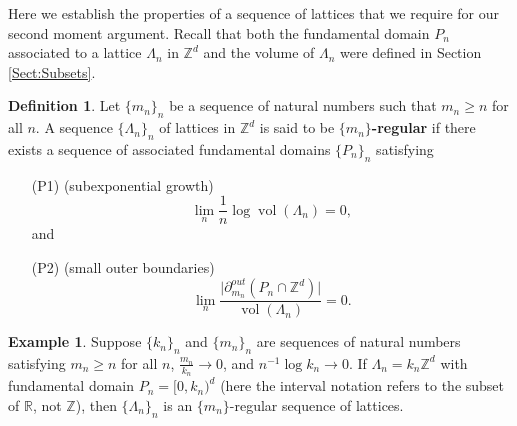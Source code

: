 \documentclass[12pt]{amsart}
\theoremstyle{definition}
\newtheorem{definition}[theorem]{Definition}
\newtheorem{example}[theorem]{Example}
\def\Z{\mathbb{Z}}
\DeclareMathOperator{\dist}{dist}
\DeclareMathOperator{\vol}{vol}
\begin{document}
Here we establish the properties of a sequence of lattices that we require for our second moment argument. %
Recall that both the fundamental domain $P_n$ associated to a lattice $\Lambda_n$ in $\mathbb{Z}^d$ and the volume of $\Lambda_n$ were defined in Section \ref{Sect:Subsets}.
\begin{definition} \label{Defn:PeriodicMarkerCondition}
Let $\{m_n\}_n$ be a sequence of natural numbers such that $m_n \geq n$ for all $n$.
A sequence $\{\Lambda_n\}_n$ of lattices in $\mathbb{Z}^d$ is said to be \textbf{$\{m_n\}$-regular} if there exists a sequence of associated fundamental domains $\{P_n\}_n$ satisfying 
\begin{enumerate}
\item[(P1)] (subexponential growth) 
\begin{equation*}
\lim_n \frac{1}{n} \log \vol(\Lambda_n) = 0,
\end{equation*}
and
\item[(P2)] (small outer boundaries) 
\begin{equation*}
\lim_n \frac{ \bigl| \partial_{m_n}^{out}(P_n \cap \mathbb{Z}^d) %
\bigr|} {\vol(\Lambda_n)} = 0.
\end{equation*}
\end{enumerate}
\end{definition}


\begin{example}\label{cubeexample}
Suppose $\{k_n\}_n$ and $\{m_n\}_n$ are sequences of natural numbers satisfying $m_n \geq n$ for all $n$,  $\frac{m_n}{k_n} \to 0$, and $n^{-1} \log k_n \to 0$. If $\Lambda_n = k_n \mathbb{Z}^d$ with fundamental domain $P_n = [0,k_n)^d$ (here the interval notation refers to the subset of $\mathbb{R}$, not $\mathbb{Z}$), then $\{\Lambda_n\}_n$ is an $\{m_n\}$-regular sequence of lattices.
\end{example}
\end{document}
